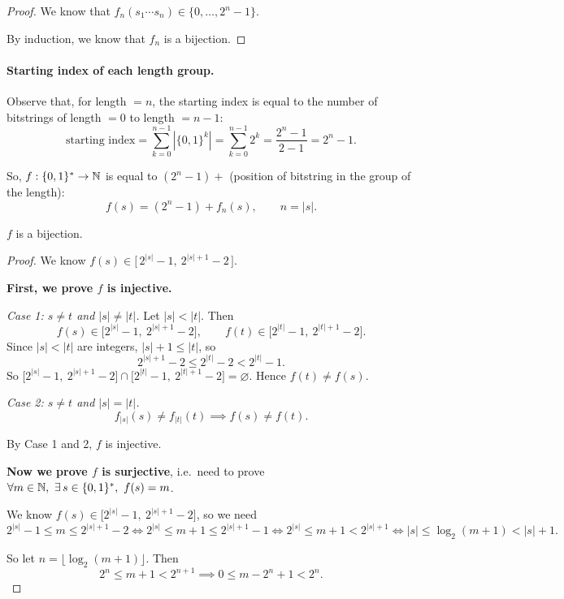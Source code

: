 \documentclass[11pt]{article}
\begin{document}
\begin{solution}[(a)]
\begin{proof}
    We know that $f_n(s_1\cdots s_n)\in\{0,\dots,2^n-1\}$.

    By induction, we know that $f_n$ is a bijection.
\end{proof}

\paragraph{Starting index of each length group.} Observe that, for
length $=n$, the starting index is equal to the number of bitstrings of
length $=0$ to length $=n-1$:
\[
    \text{starting index} = \sum_{k=0}^{n-1} |\{0,1\}^k| = \sum_{k=0}^{n-1} 2^k
    = \frac{2^n-1}{2-1} = 2^n-1.
\]

So, $f : \{0,1\}^* \to \mathbb{N}$ is equal to $(2^n-1) + $ (position of bitstring
in the group of the length):
\[
    f(s) = (2^n-1) + f_n(s), \qquad n = |s|.
\]

\begin{claim}
    $f$ is a bijection.
\end{claim}
\begin{proof}
    We know $f(s) \in \big[\,2^{|s|}-1,\ 2^{|s|+1}-2\,\big]$.

    \textbf{First, we prove $f$ is injective.}

    \emph{Case 1: $s\ne t$ and $|s|\ne|t|$.} Let $|s|<|t|$. Then
    \[
        f(s) \in \big[2^{|s|}-1,\ 2^{|s|+1}-2\big], \qquad
        f(t) \in \big[2^{|t|}-1,\ 2^{|t|+1}-2\big].
    \]
    Since $|s|<|t|$ are integers, $|s|+1\le|t|$, so
    \[
        2^{|s|+1}-2 \le 2^{|t|}-2 < 2^{|t|}-1.
    \]
    So $\big[2^{|s|}-1,\ 2^{|s|+1}-2\big] \cap \big[2^{|t|}-1,\ 2^{|t|+1}-2\big]
    = \varnothing$. Hence $f(t)\ne f(s)$.

    \emph{Case 2: $s\ne t$ and $|s|=|t|$.}
    \[
        f_{|s|}(s) \ne f_{|t|}(t) \implies f(s) \ne f(t).
    \]

    By Case 1 and 2, $f$ is injective.

    \textbf{Now we prove $f$ is surjective}, i.e.\ need to prove
    $\forall m\in\N,\ \exists\, s\in\{0,1\}^*,\ f(s)=m$.

    We know $f(s) \in \big[2^{|s|}-1,\ 2^{|s|+1}-2\big]$, so we need
    \[
        2^{|s|}-1 \le m \le 2^{|s|+1}-2
        \iff
        2^{|s|} \le m+1 \le 2^{|s|+1}-1
        \iff
        2^{|s|} \le m+1 < 2^{|s|+1}
        \iff
        |s| \le \log_2(m+1) < |s|+1.
    \]

    So let $n = \lfloor \log_2(m+1) \rfloor$. Then
    \[
        2^n \le m+1 < 2^{n+1}
        \implies
        0 \le m - 2^n + 1 < 2^n.
    \]


\end{proof}
\end{solution}
\end{document}
